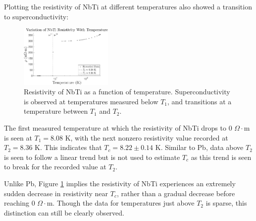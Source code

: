 \documentclass[prl,twocolumn,superscriptaddress,floatfix]{revtex4}
\begin{document}
Plotting the resistivity of NbTi at different temperatures also showed a transition to superconductivity:
\begin{figure}[H]
    \begin{center}
    \includegraphics[width = 0.4\textwidth]{nbti_final.pdf}
    \caption{Resistivity of NbTi as a function of temperature. Superconductivity is observed at temperatures measured below $T_1$, and transitions at a temperature between $T_1$ and $T_2$.}
    \label{fig:nbt_resistivity}
    \end{center}
\end{figure}
The first measured temperature at which the resistivity of NbTi drops to 0 $\Omega \cdot$m is seen at $T_1=8.08$ K, with the next nonzero resistivity value recorded at $T_2=8.36$ K. This indicates that $T_c=8.22 \pm 0.14$ K. Similar to Pb, data above $T_2$ is seen to follow a linear trend but is not used to estimate $T_c$ as this trend is seen to break for the recorded value at $T_2$.

Unlike Pb, Figure \ref{fig:nbt_resistivity} implies the resistivity of NbTi experiences an extremely sudden decrease in resistivity near $T_c$, rather than a gradual decrease before reaching 0 $\Omega \cdot$m. Though the data for temperatures just above $T_2$ is sparse, this distinction can still be clearly observed.
\end{document}
